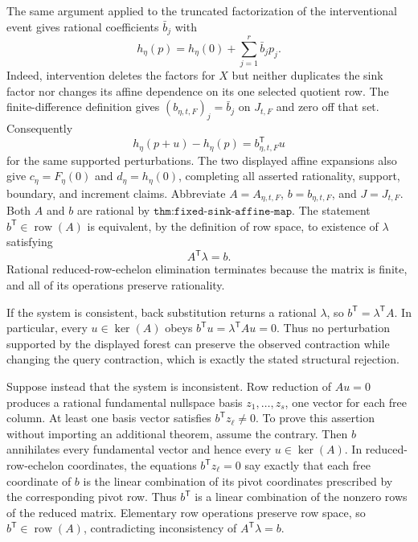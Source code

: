 The same argument applied to the truncated factorization of the interventional event gives rational coefficients \(\bar b_j\) with
\[
 h_\eta(p)=h_\eta(0)+\sum_{j=1}^r\bar b_jp_j.
\]
Indeed, intervention deletes the factors for \(X\) but neither duplicates the sink factor nor changes its affine dependence on its one selected quotient row. The finite-difference definition gives \((b_{\eta,t,F})_j=\bar b_j\) on \(J_{t,F}\) and zero off that set. Consequently
\[
 h_\eta(p+u)-h_\eta(p)=b_{\eta,t,F}^{\mathsf T}u
\]
for the same supported perturbations. The two displayed affine expansions also give \(c_\eta=F_\eta(0)\) and \(d_\eta=h_\eta(0)\), completing all asserted rationality, support, boundary, and increment claims.
Abbreviate \(A=A_{\eta,t,F}\), \(b=b_{\eta,t,F}\), and \(J=J_{t,F}\). Both \(A\) and \(b\) are rational by \(\texttt{thm:fixed-sink-affine-map}\). The statement \(b^{\mathsf T}\in\operatorname{row}(A)\) is equivalent, by the definition of row space, to existence of \(\lambda\) satisfying
\[
 A^{\mathsf T}\lambda=b.
\]
Rational reduced-row-echelon elimination terminates because the matrix is finite, and all of its operations preserve rationality.

If the system is consistent, back substitution returns a rational \(\lambda\), so \(b^{\mathsf T}=\lambda^{\mathsf T}A\). In particular, every \(u\in\ker(A)\) obeys \(b^{\mathsf T}u=\lambda^{\mathsf T}Au=0\). Thus no perturbation supported by the displayed forest can preserve the observed contraction while changing the query contraction, which is exactly the stated structural rejection.

Suppose instead that the system is inconsistent. Row reduction of \(Au=0\) produces a rational fundamental nullspace basis \(z_1,\ldots,z_s\), one vector for each free column. At least one basis vector satisfies \(b^{\mathsf T}z_\ell\ne0\). To prove this assertion without importing an additional theorem, assume the contrary. Then \(b\) annihilates every fundamental vector and hence every \(u\in\ker(A)\). In reduced-row-echelon coordinates, the equations \(b^{\mathsf T}z_\ell=0\) say exactly that each free coordinate of \(b\) is the linear combination of its pivot coordinates prescribed by the corresponding pivot row. Thus \(b^{\mathsf T}\) is a linear combination of the nonzero rows of the reduced matrix. Elementary row operations preserve row space, so \(b^{\mathsf T}\in\operatorname{row}(A)\), contradicting inconsistency of \(A^{\mathsf T}\lambda=b\).

